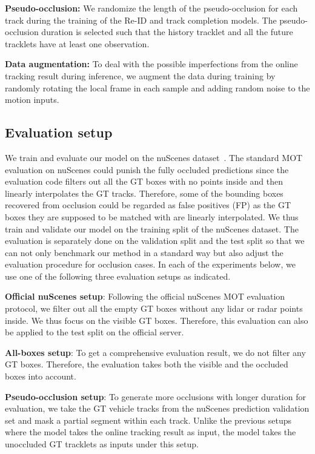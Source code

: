 \documentclass{article} \usepackage{iclr2023_conference,times}
\begin{document}
\textbf{Pseudo-occlusion:} 
We randomize the length of the pseudo-occlusion for each track during the training of the Re-ID and track completion models. 
The pseudo-occlusion duration is selected such that the history tracklet and all the future tracklets have at least one observation.

\textbf{Data augmentation:} 
To deal with the possible imperfections from the online tracking result during inference, we augment the data during training by randomly rotating the local frame in each sample and adding random noise to the motion inputs. 

\subsection{Evaluation setup} 
\vspace{-1mm}
We train and evaluate our model on the nuScenes dataset~\cite{nuscenes}. 
The standard MOT evaluation on nuScenes could punish the fully occluded predictions since the evaluation code filters out all the GT boxes with no points inside and then linearly interpolates the GT tracks. Therefore, some of the bounding boxes recovered from occlusion could be regarded as false positives (FP) as the GT boxes they are supposed to be matched with are linearly interpolated. We thus train and validate our model on the training split of the nuScenes dataset. The evaluation is separately done on the validation split and the test split so that we can not only benchmark our method in a standard way but also adjust the evaluation procedure for occlusion cases. 
In each of the experiments below, we use one of the following three evaluation setups as indicated.

\textbf{Official nuScenes setup}: Following the official nuScenes MOT evaluation protocol, we filter out all the empty GT boxes without any lidar or radar points inside. We thus focus on the visible GT boxes. Therefore, this evaluation can also be applied to the test split on the official server.

\textbf{All-boxes setup}: To get a comprehensive evaluation result, we do not filter any GT boxes. Therefore, the evaluation takes both the visible and the occluded boxes into account.

\textbf{Pseudo-occlusion setup}: To generate more occlusions with longer duration for evaluation, we take the GT vehicle tracks from the nuScenes prediction validation set and mask a partial segment within each track. Unlike the previous setups where the model takes the online tracking result as input, the model takes the unoccluded GT tracklets as inputs under this setup. 
\end{document}
